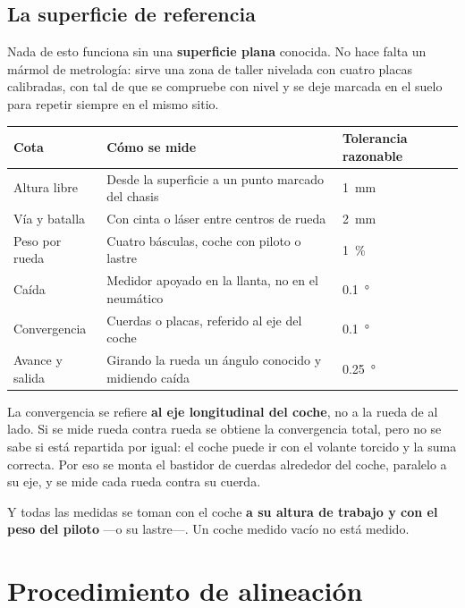 \subsection{La superficie de referencia}

Nada de esto funciona sin una \textbf{superficie plana} conocida. No hace falta
un mármol de metrología: sirve una zona de taller nivelada con cuatro placas
calibradas, con tal de que se compruebe con nivel y se deje marcada en el suelo
para repetir siempre en el mismo sitio.

\begin{center}
\begin{tabularx}{\textwidth}{@{}lXl@{}}
\toprule
\textbf{Cota} & \textbf{Cómo se mide} & \textbf{Tolerancia razonable} \\
\midrule
Altura libre & Desde la superficie a un punto marcado del chasis & \SI{1}{\milli\meter} \\
Vía y batalla & Con cinta o láser entre centros de rueda & \SI{2}{\milli\meter} \\
Peso por rueda & Cuatro básculas, coche con piloto o lastre & \SI{1}{\percent} \\
Caída & Medidor apoyado en la llanta, no en el neumático & \SI{0.1}{\degree} \\
Convergencia & Cuerdas o placas, referido al eje del coche & \SI{0.1}{\degree} \\
Avance y salida & Girando la rueda un ángulo conocido y midiendo caída & \SI{0.25}{\degree} \\
\bottomrule
\end{tabularx}
\end{center}

\begin{ojo}
La convergencia se refiere \textbf{al eje longitudinal del coche}, no a la rueda
de al lado. Si se mide rueda contra rueda se obtiene la convergencia total, pero
no se sabe si está repartida por igual: el coche puede ir con el volante torcido
y la suma correcta. Por eso se monta el bastidor de cuerdas alrededor del coche,
paralelo a su eje, y se mide cada rueda contra su cuerda.

Y todas las medidas se toman con el coche \textbf{a su altura de trabajo y con
el peso del piloto} ---o su lastre---. Un coche medido vacío no está medido.
\end{ojo}

\section{Procedimiento de alineación}
\label{sec:montaje_alineacion:02}

